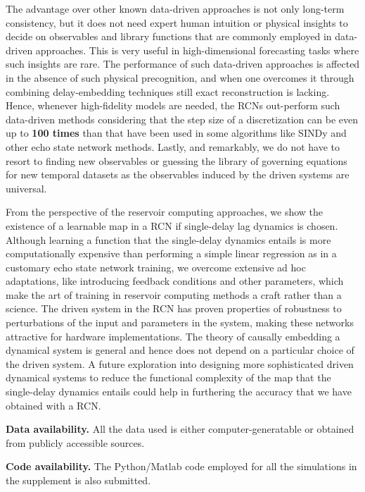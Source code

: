 \documentclass[12 pt]{article}
\begin{document}


The advantage over other known data-driven approaches is not only long-term consistency, but it does not need expert human intuition or physical insights to decide on observables and library functions that are commonly employed in data-driven approaches. This is very useful in high-dimensional forecasting tasks where such insights are rare. 
 The performance of such data-driven approaches is affected in the absence of such physical precognition, and when one overcomes it through combining delay-embedding techniques still exact reconstruction is lacking.
Hence, whenever high-fidelity models are needed, the RCNs out-perform such data-driven methods considering that the step size of a discretization can be even up to {\bf 100 times} than that have been used in some algorithms like SINDy and other echo state network methods. Lastly, and remarkably, we do not have to resort to finding new observables or guessing the library of governing equations for new temporal datasets as the observables induced by the driven systems are universal. 



From the perspective of the reservoir computing approaches, we show the existence of a learnable map in a RCN if single-delay lag dynamics is chosen. Although learning a function that the single-delay dynamics entails is more computationally expensive than performing a simple linear regression as in a customary echo state network training, we overcome extensive ad hoc adaptations, like introducing feedback conditions and other parameters, which make the art of training in reservoir computing methods a craft rather than a science.  
The driven system in the RCN  has proven properties of robustness to perturbations of the input and parameters in the system, making these networks attractive for hardware implementations. The theory of causally embedding a dynamical system is general and hence does not depend on a particular choice of the driven system. A future exploration into designing more sophisticated driven dynamical systems to reduce the functional complexity of the map that the single-delay dynamics entails could help in furthering the accuracy that we have obtained with a RCN.




{\bf Data availability.}  All the data used is either computer-generatable or obtained from publicly accessible sources. 

{\bf Code availability.} The Python/Matlab code employed for all the simulations in the supplement is also submitted.




\end{document}
